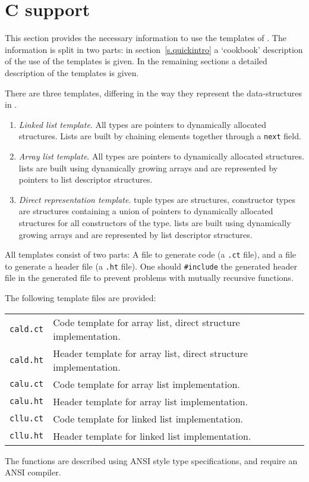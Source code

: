 \chapter{C support}
\label{s.tmc}
This section provides the necessary information to use the {\C}
templates of {\Tm}.
The information is split in two parts: in section~\ref{s.quickintro}
a `cookbook' description of the use of the templates is given.
In the remaining sections a detailed description of the templates is given.
\par
There are three {\C} templates,
differing in the way they represent the {\Tm} data-structures in {\C}.
\begin{enumerate}
\item
{\em Linked list template}.
All {\Tm} types are pointers to dynamically allocated {\C} structures.
Lists are built by chaining elements together through a {\tt next} field.
\item
{\em Array list template}.
All {\Tm} types are pointers to dynamically allocated {\C} structures.
{\Tm} lists are built using dynamically growing arrays and are represented by
pointers to list descriptor structures.
\item
{\em Direct representation template}.
{\Tm} tuple types are {\C} structures,
{\Tm} constructor types are {\C} structures containing a union of pointers
to dynamically allocated {\C} structures for all constructors of the
type.
{\Tm} lists are built using dynamically growing arrays and are
represented by list descriptor structures.
\end{enumerate}
\par
All {\C} templates consist of two parts:
A file to generate {\C} code (a {\tt .ct} file),
and a file to generate a header file (a {\tt .ht} file).
One should {\tt \#include} the generated header file in the generated
{\C} file to prevent problems with mutually recursive functions.
\par
The following template files are provided:
\begin{flushleft}
\begin{tabular}{ll}
{\tt cald.ct} & Code template for array list, direct structure implementation. \\
{\tt cald.ht} & Header template for array list, direct structure implementation. \\
{\tt calu.ct} & Code template for array list implementation. \\
{\tt calu.ht} & Header template for array list implementation. \\
{\tt cllu.ct} & Code template for linked list implementation. \\
{\tt cllu.ht} & Header template for linked list implementation. \\
\end{tabular}
\end{flushleft}
\par
{}
The functions are described using ANSI {\C} style type specifications,
and require an ANSI {\C} compiler.
